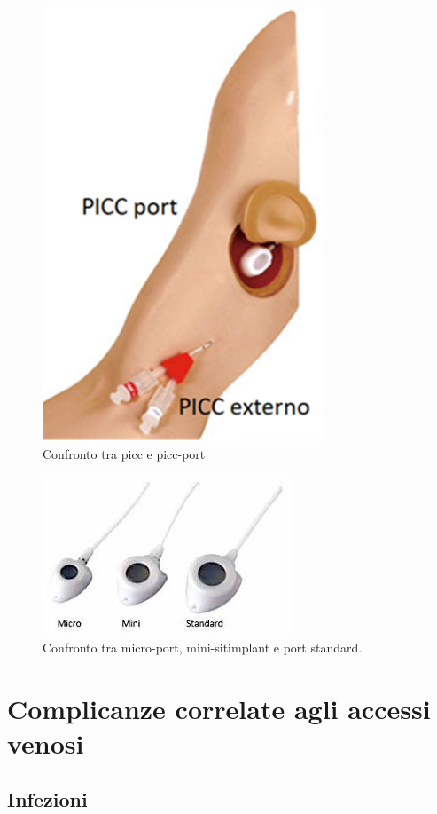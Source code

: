\begin{figure}[H]
    \begin{center}
    \includegraphics[width=0.3\columnwidth]{img/PartesPICC.png}
    \end{center}
    \caption{Confronto tra picc e picc-port
    \cite{img49}}
    \label{fig:FIGURE_4.13}
\end{figure}

\begin{figure}[H]
    \begin{center}
    \includegraphics[width=0.4\columnwidth]{img/portconfronto.jpeg}
    \end{center}
    \caption{Confronto tra micro-port, mini-sitimplant e port standard.
    \cite{img50}}
    \label{fig:FIGURE_4.14}
\end{figure}

\section{Complicanze correlate agli accessi venosi}

\subsection{Infezioni}

